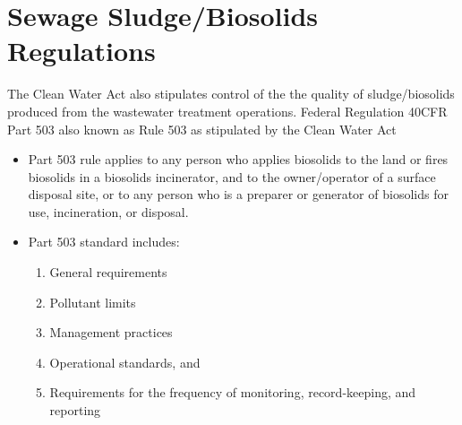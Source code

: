 \documentclass{article}
\begin{document}
\section{Sewage Sludge/Biosolids Regulations}
The Clean Water Act also stipulates control of the the quality of sludge/biosolids produced from the wastewater treatment operations.  Federal Regulation 40CFR Part 503 also known as Rule 503  as stipulated by the Clean Water Act 
			\begin{itemize}
				\item Part 503 rule applies to any person who applies biosolids to the land or fires biosolids in a biosolids incinerator, and to the owner/operator of a surface disposal site, or to any person who is a preparer or generator of biosolids for use, incineration, or disposal.
				\item Part 503 standard includes:
					\begin{enumerate}
						\item General requirements
						\item Pollutant limits
						\item Management practices
						\item Operational standards, and
						\item Requirements for the frequency of monitoring, record-keeping, and reporting
					\end{enumerate}
			\end{itemize}
\end{document}
